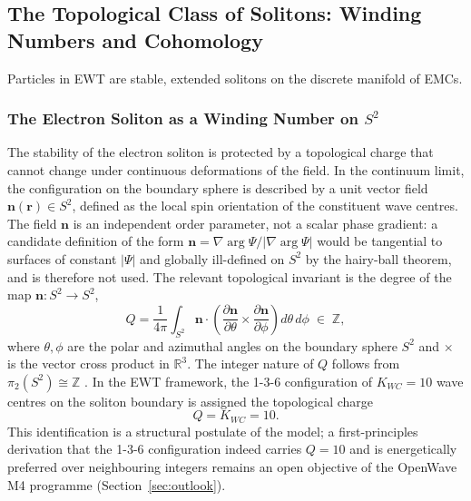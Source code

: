 \documentclass[10pt,a4paper]{article}
\begin{document}
\subsection{The Topological Class of Solitons: Winding Numbers and Cohomology}
Particles in EWT are stable, extended solitons on the discrete manifold of EMCs.

\subsubsection{The Electron Soliton as a Winding Number on $S^2$}
\label{subsub:winding_number}

The stability of the electron soliton is protected by a topological
charge that cannot change under continuous deformations of the field.
In the continuum limit, the configuration on the boundary sphere is
described by a unit vector field $\mathbf{n}(\mathbf{r}) \in S^2$,
defined as the local spin orientation of the constituent wave
centres. The field $\mathbf{n}$ is an independent order parameter,
not a scalar phase gradient: a candidate definition of the form
$\mathbf{n} = \nabla \arg\Psi / |\nabla \arg\Psi|$ would be tangential
to surfaces of constant $|\Psi|$ and globally ill-defined on $S^2$ by
the hairy-ball theorem, and is therefore not used. The relevant
topological invariant is the degree of the map $\mathbf{n}: S^2 \to S^2$,
\begin{equation}
	Q = \frac{1}{4\pi} \int_{S^2}
	\mathbf{n} \cdot
	\left(
	\frac{\partial \mathbf{n}}{\partial \theta}
	\times
	\frac{\partial \mathbf{n}}{\partial \phi}
	\right)
	d\theta\, d\phi
	\;\in\; \mathbb{Z},
	\label{eq:winding_number}
\end{equation}
where $\theta, \phi$ are the polar and azimuthal angles on the boundary
sphere $S^2$ and $\times$ is the vector cross product in
$\mathbb{R}^3$. The integer nature of $Q$ follows from
$\pi_2(S^2) \cong \mathbb{Z}$ \cite{MantonSutcliffe2004}. In the EWT
framework, the 1-3-6 configuration of $K_{WC}=10$ wave centres on the
soliton boundary is assigned the topological charge
\begin{equation}
	Q = K_{WC} = 10.
	\label{eq:Q_KWC}
\end{equation}
This identification is a structural postulate of the model; a
first-principles derivation that the 1-3-6 configuration indeed
carries $Q=10$ and is energetically preferred over neighbouring
integers remains an open objective of the OpenWave M4 programme
(Section~\ref{sec:outlook}).
\end{document}
